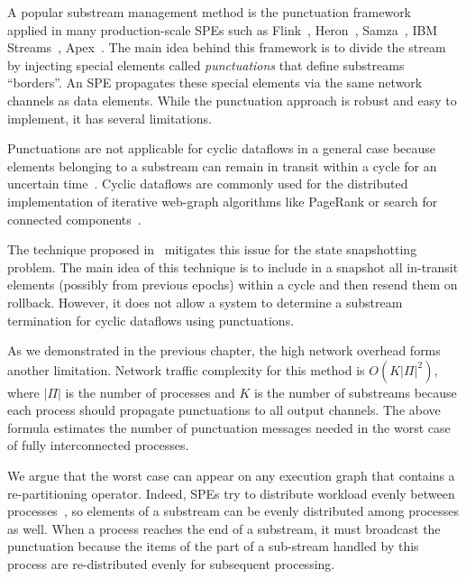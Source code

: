 A popular substream management method is the punctuation framework~\cite{tucker2003exploiting} applied in many production-scale SPEs such as Flink~\cite{carbone2015apache}, Heron~\cite{Kulkarni:2015:THS:2723372.2742788}, Samza~\cite{Noghabi:2017:SSS:3137765.3137770}, IBM Streams~\cite{jacques2016consistent}, Apex~\cite{pathak2016introduction}. The main idea behind this framework is to divide the stream by injecting special elements called {\em punctuations} that define substreams ``borders''. An SPE propagates these special elements via the same network channels as data elements. While the punctuation approach is robust and easy to implement, it has several limitations. 

Punctuations are not applicable for cyclic dataflows in a general case because elements belonging to a substream can remain in transit within a cycle for an uncertain time~\cite{carbone2018scalable}. Cyclic dataflows are commonly used for the distributed implementation of iterative web-graph algorithms like PageRank or search for connected components~\cite{ewen2012spinning, murray2016incremental, mcsherry2013differential}.

The technique proposed in~\cite{Carbone:2017:SMA:3137765.3137777} mitigates this issue for the state snapshotting problem. The main idea of this technique is to include in a snapshot all in-transit elements (possibly from previous epochs) within a cycle and then resend them on rollback. However, it does not allow a system to determine a substream termination for cyclic dataflows using punctuations.

As we demonstrated in the previous chapter, the high network overhead forms another limitation. Network traffic complexity for this method is $O(K|\Pi|^2)$, where $|\Pi|$ is the number of processes and $K$ is the number of substreams because each process should propagate punctuations to all output channels. The above formula estimates the number of punctuation messages needed in the worst case of fully interconnected processes. 

We argue that the worst case can appear on any execution graph that contains a re-partitioning operator. Indeed, SPEs try to distribute workload evenly between processes~\cite{carbone2015apache, Kulkarni:2015:THS:2723372.2742788, Akidau:2013:MFS:2536222.2536229}, so elements of a substream can be evenly distributed among processes as well. When a process reaches the end of a substream, it must broadcast the punctuation because the items of the part of a sub-stream handled by this process are re-distributed evenly for subsequent processing.

